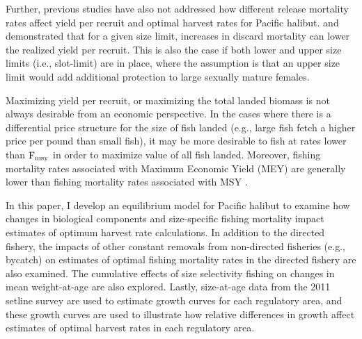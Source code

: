 Further, previous studies have also not addressed how different release mortality rates affect  yield per recruit and optimal harvest rates for Pacific halibut.  \cite{coggins2007ecm} and \cite{pineiii2008car} demonstrated that for a given size limit, increases in discard mortality can lower the realized yield per recruit. This is also the case if both lower and upper size limits (i.e., slot-limit) are in place, where the assumption is that an upper size limit would add additional protection to large sexually mature females.

Maximizing  yield per recruit, or maximizing the total landed biomass is not always desirable from an economic perspective.  In the cases where there is a differential price structure for the size of fish landed (e.g., large fish fetch a higher price per pound  than small fish), it may be more desirable to fish at rates lower than $\rm{F_{msy}}$ in order to maximize value of all fish landed.  Moreover, fishing mortality rates associated with Maximum Economic Yield (MEY) are generally lower than fishing mortality rates associated with MSY \citep{gordon1954economic}.

In this paper, I develop an equilibrium model for Pacific halibut to examine how changes in biological components and size-specific fishing mortality impact estimates of optimum harvest rate calculations.  In addition to the directed fishery, the impacts of other constant removals from non-directed fisheries (e.g., bycatch) on estimates of optimal fishing mortality rates in the directed fishery are also examined.  The cumulative effects of size selectivity fishing on changes in mean weight-at-age are also explored. Lastly, size-at-age data from the 2011  setline survey are used to estimate growth curves for each regulatory area, and these growth curves are used to illustrate how relative differences in growth affect estimates of optimal harvest rates in each regulatory area.






